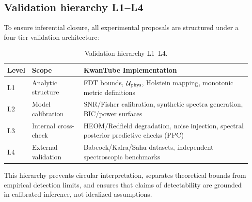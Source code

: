 \documentclass[twocolumn,10pt]{article}
\begin{document}
\subsection{Validation hierarchy L1--L4}
To ensure inferential closure, all experimental proposals are structured under a four-tier validation architecture:
\begin{table}[t]
\centering
\caption{Validation hierarchy L1--L4.}
\footnotesize
\begin{tabular}{p{1.5cm}p{3.5cm}p{8.5cm}}
\toprule
Level & Scope & KwanTube Implementation \\
\midrule
L1 & Analytic structure & FDT bounds, $\mathcal{U}_{\rm phys}$, Holstein mapping, monotonic metric definitions \\
L2 & Model calibration & SNR/Fisher calibration, synthetic spectra generation, BIC/power surfaces \\
L3 & Internal cross-check & HEOM/Redfield degradation, noise injection, spectral posterior predictive checks (PPC) \\
L4 & External validation & Babcock/Kalra/Sahu datasets, independent spectroscopic benchmarks \\
\bottomrule
\end{tabular}
\end{table}
This hierarchy prevents circular interpretation, separates theoretical bounds from empirical detection limits, and ensures that claims of detectability are grounded in calibrated inference, not idealized assumptions.
\end{document}
